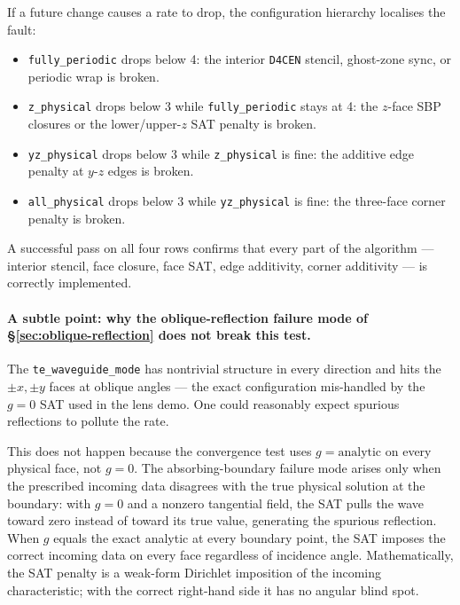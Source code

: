 \documentclass[11pt]{article}
\begin{document}
If a future change causes a rate to drop, the configuration
hierarchy localises the fault:

\begin{itemize}[itemsep=2pt,topsep=2pt]
  \item \texttt{fully\_periodic} drops below 4: the interior
        \texttt{D4CEN} stencil, ghost-zone sync, or periodic
        wrap is broken.
  \item \texttt{z\_physical} drops below 3 while
        \texttt{fully\_periodic} stays at 4: the $z$-face SBP
        closures or the lower/upper-$z$ SAT penalty is broken.
  \item \texttt{yz\_physical} drops below 3 while
        \texttt{z\_physical} is fine: the additive edge penalty
        at $y$-$z$ edges is broken.
  \item \texttt{all\_physical} drops below 3 while
        \texttt{yz\_physical} is fine: the three-face corner
        penalty is broken.
\end{itemize}

A successful pass on all four rows confirms that every part of
the algorithm --- interior stencil, face closure, face SAT, edge
additivity, corner additivity --- is correctly implemented.

\paragraph{A subtle point: why the oblique-reflection failure mode
of \S\ref{sec:oblique-reflection} does not break this test.}
The \texttt{te\_waveguide\_mode} has nontrivial structure in every
direction and hits the $\pm x, \pm y$ faces at oblique angles ---
the exact configuration mis-handled by the $g = 0$ SAT used in the
lens demo.  One could reasonably expect spurious reflections to
pollute the rate.

This does not happen because the convergence test uses
$g = \text{analytic}$ on every physical face, not $g = 0$.  The
absorbing-boundary failure mode arises only when the prescribed
incoming data disagrees with the true physical solution at the
boundary: with $g = 0$ and a nonzero tangential field, the SAT
pulls the wave toward zero instead of toward its true value,
generating the spurious reflection.  When $g$ equals the exact
analytic at every boundary point, the SAT imposes the correct
incoming data on every face regardless of incidence angle.
Mathematically, the SAT penalty is a weak-form Dirichlet
imposition of the incoming characteristic; with the correct
right-hand side it has no angular blind spot.
\end{document}
